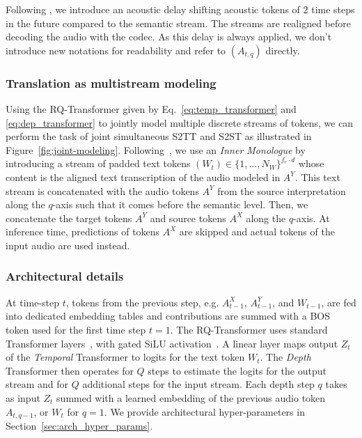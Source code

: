 Following \citep{musicgen,moshi}, we introduce an acoustic delay shifting acoustic tokens of 2 time steps in the future compared to the semantic stream. The streams are realigned before decoding the audio with the codec. As this delay is always applied, we don't introduce new notations for readability and refer to $(A_{t,q})$ directly.

\subsubsection{Translation as multistream modeling}
\label{sec:multistream_modeling}

Using the RQ-Transformer given by Eq.~\eqref{eq:temp_transformer} and \eqref{eq:dep_transformer} to jointly model multiple discrete streams of tokens, we can perform the task of joint simultaneous S2TT and S2ST as illustrated in Figure~\ref{fig:joint-modeling}.
Following~\cite{moshi}, we use an \textit{Inner Monologue} by introducing a stream of padded text tokens $(W_t) \in \{1, \ldots, N_W\}^{f_r \cdot d}$ whose content is the aligned text transcription of the audio modeled in $A^Y$. This text stream is concatenated with the audio tokens $A^Y$ from the source interpretation along the $q$-axis such that it comes before the semantic level.
Then, we concatenate the target tokens $A^Y$ and source tokens $A^X$ along the $q$-axis.
At inference time, predictions of tokens $A^X$ are skipped and actual tokens of the input audio are used instead.

\subsubsection{Architectural details}
\label{sec:arch_details}

At time-step $t$, tokens from the previous step, e.g. $A^X_{t-1}$,
$A^Y_{t-1}$, and $W_{t-1}$, are fed into dedicated embedding tables and contributions are summed with a BOS token used for the first time step $t = 1$.
The RQ-Transformer uses standard Transformer layers~\citep{attentionvaswani}, with gated SiLU activation~\citep{shazeer2020glu,hendrycks2016gaussian}.
A linear layer maps output $Z_t$ of the \emph{Temporal} Transformer to logits for the text token $W_t$.
The \emph{Depth} Transformer then operates for $Q$ steps to estimate the logits for the output stream and for $Q$ additional steps for the input stream.
Each depth step $q$ takes as input $Z_t$ summed with a learned embedding of the previous audio token $A_{t, q - 1}$, or $W_t$ for $q = 1$.
We provide architectural hyper-parameters in Section~\ref{sec:arch_hyper_params}.


